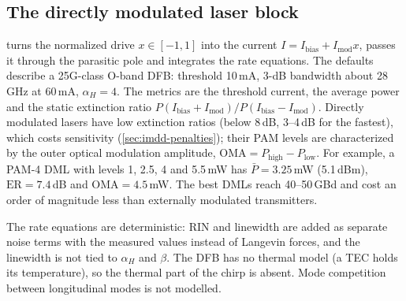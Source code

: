 \subsection{The directly modulated laser block}
 turns the normalized drive $x\in[-1,1]$ into the current
$I=I_{\mathrm{bias}}+I_{\mathrm{mod}}x$, passes it through the parasitic pole and integrates the rate
equations. The defaults describe a 25G-class O-band DFB: threshold 10\,mA, 3-dB bandwidth about
28\,GHz at 60\,mA, $\alpha_H=4$. The metrics are the threshold current, the average power and the
static extinction ratio $P(I_{\mathrm{bias}}+I_{\mathrm{mod}})/P(I_{\mathrm{bias}}-I_{\mathrm{mod}})$. Directly modulated lasers
have low extinction ratios (below 8\,dB, 3--4\,dB for the fastest), which costs sensitivity
(\cref{sec:imdd-penalties}); their PAM levels are characterized by the outer optical modulation
amplitude, $\mathrm{OMA}=P_{\mathrm{high}}-P_{\mathrm{low}}$. For example, a PAM-4 DML with levels 1, 2.5, 4 and 5.5\,mW has
$\bar P=3.25$\,mW (5.1\,dBm), $\mathrm{ER}=7.4$\,dB and $\mathrm{OMA}=4.5$\,mW. The best DMLs reach 40--50\,GBd and
cost an order of magnitude less than externally modulated transmitters.

\begin{pitfall}
The rate equations are deterministic: RIN and linewidth are added as separate noise terms with
the measured values instead of Langevin forces, and the linewidth is not tied to $\alpha_H$ and
$\beta$. The DFB has no thermal model (a TEC holds its temperature), so the thermal part of the chirp
is absent. Mode competition between longitudinal modes is not modelled.
\end{pitfall}


